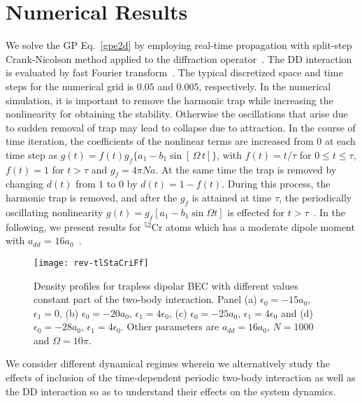 \documentclass[amsmath,amssymb,article,twocolumn,superscriptaddress,showpacs,10pt]{revtex4-1}
\begin{document}
\section{Numerical Results}
\label{sec4}
We solve the GP Eq.~\eqref{gpe2d} by employing real-time propagation with split-step Crank-Nicolson method applied to the diffraction operator~\cite{Muruganandam:2009,RKK:2015}. The DD interaction is evaluated by fast Fourier transform~\cite{Goral:2002}. The typical discretized space and time steps for the numerical grid is $0.05$ and $0.005$, respectively. In the numerical simulation, it is important to remove the harmonic trap while increasing the nonlinearity for obtaining the stability. Otherwise the oscillations that arise due to sudden removal of trap may lead to collapse due to attraction. In the course of time iteration, the coefficients of the nonlinear terms are increased from $0$ at each time step as $g(t) = f(t) g_f  \{a_1-b_1\sin[\,\Omega\, t]\}$, with $f(t)=t/\tau$ for $0 \leq t \leq \tau$, $f(t)=1$ for $t > \tau$ and $g_f=4\pi N a$. At the same time the trap is removed by changing $d(t)$ from $1$ to $0$ by $d(t)=1-f(t)$. 
During this process, the harmonic trap is removed, and after the $g_f$ is attained at time $\tau$, the periodically oscillating nonlinearity $g(t)=g_f[a_1-b_1 \sin \Omega t  ]$ is effected for $t> \tau$~\cite{Sabari:2010,Adhikari:2004,Saito:2003}. In the following, we present results for $^{52}$Cr atoms which has a moderate dipole moment with $a_{dd}$ = $16a_0$~\cite{Koch:2008,Lahaye:2009}. 
%
\begin{figure}[h!]
\begin{center}
 \texttt{[image: rev-tlStaCriFf]}
\end{center}
\caption{Density profiles for trapless dipolar BEC with different values  constant part of the two-body interaction. Panel (a) $\epsilon_0=-15a_0$, $\epsilon_1=0$, (b) $\epsilon_0=-20a_0$, $\epsilon_1=4 \epsilon_0$, (c) $\epsilon_0=-25a_0$, $\epsilon_1=4 \epsilon_0$ and (d) $\epsilon_0=-28a_0$, $\epsilon_1=4 \epsilon_0$. Other parameters are $a_{dd}=16 a_0$, $N=1000$ and $\Omega=10\pi$.}
\label{fig:nu1}
\end{figure}
We consider different dynamical regimes wherein we alternatively study the effects of inclusion of the time-dependent periodic two-body interaction as well as the DD interaction so as to understand their effects on the system dynamics. 
\end{document}
